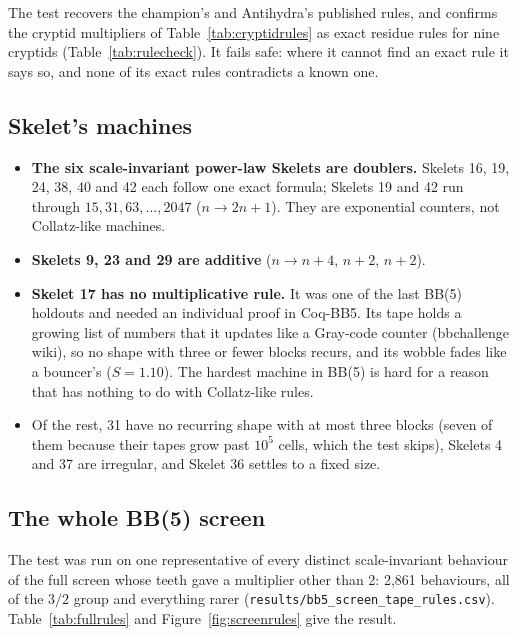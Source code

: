 \documentclass[11pt,a4paper]{article}
\newcommand{\BB}[1]{BB(#1)}
\begin{document}
The test recovers the champion's and Antihydra's published rules, and confirms the cryptid
multipliers of Table~\ref{tab:cryptidrules} as exact residue rules for nine cryptids
(Table~\ref{tab:rulecheck}). It fails safe: where it cannot find an exact rule it says so, and
none of its exact rules contradicts a known one.

\subsection{Skelet's machines}
\begin{itemize}
\item \textbf{The six scale-invariant power-law Skelets are doublers.} Skelets 16, 19, 24, 38, 40
and 42 each follow one exact formula; Skelets 19 and 42 run through $15, 31, 63, \dots, 2047$
($n \to 2n + 1$). They are exponential counters, not Collatz-like machines.
\item \textbf{Skelets 9, 23 and 29 are additive} ($n \to n + 4$, $n + 2$, $n + 2$).
\item \textbf{Skelet 17 has no multiplicative rule.} It was one of the last \BB{5} holdouts and needed
an individual proof in Coq-BB5. Its tape holds a growing list of numbers that it updates like a
Gray-code counter (bbchallenge wiki), so no shape with three or fewer blocks recurs, and its
wobble fades like a bouncer's ($S = 1.10$). The hardest machine in \BB{5} is hard for a reason
that has nothing to do with Collatz-like rules.
\item Of the rest, 31 have no recurring shape with at most three blocks (seven of them because
their tapes grow past $10^5$ cells, which the test skips), Skelets 4 and 37 are irregular, and
Skelet 36 settles to a fixed size.
\end{itemize}

\subsection{The whole \BB{5} screen}
\label{sec:fullrules}
The test was run on one representative of every distinct scale-invariant behaviour of the full
screen whose teeth gave a multiplier other than 2: 2,861 behaviours, all of the $3/2$ group and
everything rarer (\texttt{results/bb5\_screen\_tape\_rules.csv}). Table~\ref{tab:fullrules} and
Figure~\ref{fig:screenrules} give the result.
\end{document}
